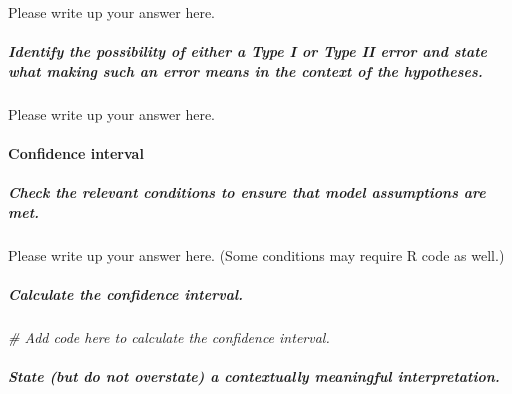 \documentclass[
]{book}
\newenvironment{Shaded}{\begin{snugshade}}{\end{snugshade}}
\newcommand{\CommentTok}[1]{\textcolor[rgb]{0.56,0.35,0.01}{\textit{#1}}}
\begin{document}
Please write up your answer here.

\hypertarget{identify-the-possibility-of-either-a-type-i-or-type-ii-error-and-state-what-making-such-an-error-means-in-the-context-of-the-hypotheses.-2}{%
\subparagraph*{Identify the possibility of either a Type I or Type II error and state what making such an error means in the context of the hypotheses.}\label{identify-the-possibility-of-either-a-type-i-or-type-ii-error-and-state-what-making-such-an-error-means-in-the-context-of-the-hypotheses.-2}}

Please write up your answer here.

\hypertarget{confidence-interval}{%
\paragraph*{Confidence interval}\label{confidence-interval}}

\hypertarget{check-the-relevant-conditions-to-ensure-that-model-assumptions-are-met.-4}{%
\subparagraph*{Check the relevant conditions to ensure that model assumptions are met.}\label{check-the-relevant-conditions-to-ensure-that-model-assumptions-are-met.-4}}

Please write up your answer here. (Some conditions may require R code as well.)

\hypertarget{calculate-the-confidence-interval.}{%
\subparagraph*{Calculate the confidence interval.}\label{calculate-the-confidence-interval.}}

\begin{Shaded}
\begin{Highlighting}[]
\CommentTok{\# Add code here to calculate the confidence interval.}
\end{Highlighting}
\end{Shaded}

\hypertarget{state-but-do-not-overstate-a-contextually-meaningful-interpretation.-1}{%
\subparagraph*{State (but do not overstate) a contextually meaningful interpretation.}\label{state-but-do-not-overstate-a-contextually-meaningful-interpretation.-1}}
\end{document}
